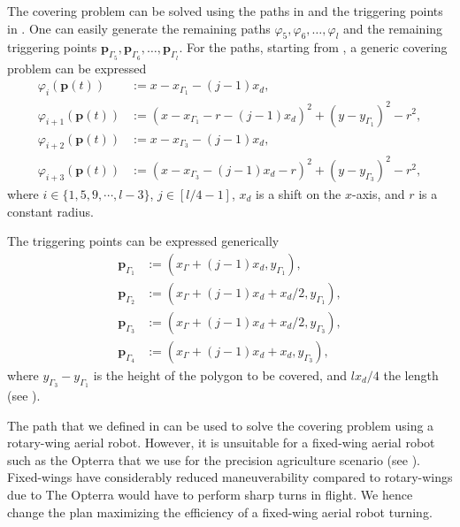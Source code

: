 The covering problem can be solved using the paths in  and the triggering points in . One can easily generate the remaining paths $\varphi_5,\varphi_6,\dots,\varphi_l$ and the remaining triggering points $\mathbf{p}_{\Gamma_5},\mathbf{p}_{\Gamma_6},\dots,\mathbf{p}_{\Gamma_l}$. For the paths, starting from , a generic covering problem can be expressed
\begin{subequations}\label{eq:basic-plan-gene}\begin{align}
  \varphi_i(\mathbf{p}(t))&:=x-x_{\Gamma_1}-(j-1)x_d,\\
  \varphi_{i+1}(\mathbf{p}(t))&:=(x-x_{\Gamma_1}-r-(j-1)x_d)^2+(y-y_{\Gamma_1})^2-r^2,\\
  \varphi_{i+2}(\mathbf{p}(t))&:=x-x_{\Gamma_3}-(j-1)x_d,\\
  \varphi_{i+3}(\mathbf{p}(t))&:=(x-x_{\Gamma_3}-(j-1)x_d-r)^2+(y-y_{\Gamma_3})^2-r^2,
\end{align}\end{subequations}
where $i\in\{1,5,9,\cdots,l-3\}$, $j\in[l/4-1]$, $x_d$ is a shift on the $x$-axis, and $r$ is a constant radius.

The triggering points can be expressed generically
\begin{subequations}\label{eq:basic-plan-trigs-gene}\begin{align}
  \mathbf{p}_{\Gamma_1}&:=(x_{\Gamma}+(j-1)x_d,y_{\Gamma_1}),\\
  \mathbf{p}_{\Gamma_2}&:=(x_{\Gamma}+(j-1)x_d+x_d/2,y_{\Gamma_1}),\\
  \mathbf{p}_{\Gamma_3}&:=(x_{\Gamma}+(j-1)x_d+x_d/2,y_{\Gamma_3}),\\
  \mathbf{p}_{\Gamma_4}&:=(x_{\Gamma}+(j-1)x_d+x_d,y_{\Gamma_3}),
\end{align}\end{subequations}
where $y_{\Gamma_3}-y_{\Gamma_1}$ is the height of the polygon to be covered, and $lx_d/4$ the length (see ).

The path that we defined in  can be used to solve the covering problem using a rotary-wing aerial robot. However, it is unsuitable for a fixed-wing aerial robot such as the Opterra that we use for the precision agriculture scenario (see ). Fixed-wings have considerably reduced maneuverability compared to rotary-wings due to  The Opterra would have to perform sharp turns in flight. We hence change the plan maximizing the efficiency of a fixed-wing aerial robot turning.


